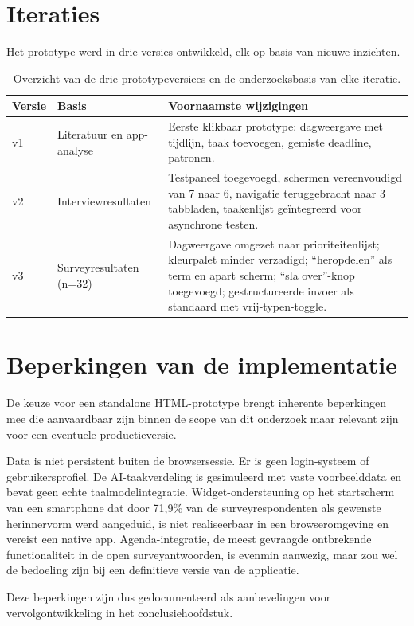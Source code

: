 \section{Iteraties}

Het prototype werd in drie versies ontwikkeld, elk op basis van nieuwe inzichten.

\begin{table}[h]
\centering
\begin{tabular}{p{1.2cm}p{3.5cm}p{7cm}}
\hline
\textbf{Versie} & \textbf{Basis} & \textbf{Voornaamste wijzigingen} \\
\hline
v1 & Literatuur en app-analyse &
Eerste klikbaar prototype: dagweergave met tijdlijn, taak toevoegen,
gemiste deadline, patronen. \\
v2 & Interviewresultaten &
Testpaneel toegevoegd, schermen vereenvoudigd van 7 naar 6, navigatie
teruggebracht naar 3 tabbladen, taakenlijst geïntegreerd voor
asynchrone testen. \\
v3 & Surveyresultaten (n=32) &
Dagweergave omgezet naar prioriteitenlijst; kleurpalet minder verzadigd;
``heropdelen'' als term en apart scherm; ``sla over''-knop toegevoegd;
gestructureerde invoer als standaard met vrij-typen-toggle. \\
\hline
\end{tabular}
\caption[Iteraties van het prototype]{Overzicht van de drie
prototypeversiees en de onderzoeksbasis van elke iteratie.}
\label{tab:iteraties}
\end{table}

\section{Beperkingen van de implementatie}

De keuze voor een standalone HTML-prototype brengt inherente beperkingen mee
die aanvaardbaar zijn binnen de scope van dit onderzoek maar relevant zijn voor
een eventuele productieversie.

Data is niet persistent buiten de browsersessie. Er is geen login-systeem of
gebruikersprofiel. De AI-taakverdeling is gesimuleerd met vaste voorbeelddata
en bevat geen echte taalmodelintegratie. Widget-ondersteuning op het startscherm
van een smartphone dat door 71,9\% van de surveyrespondenten als gewenste
herinnervorm werd aangeduid, is niet realiseerbaar in een browseromgeving en vereist
een native app. Agenda-integratie, de meest gevraagde ontbrekende functionaliteit
in de open surveyantwoorden, is evenmin aanwezig, maar zou wel de bedoeling zijn bij een definitieve versie van de applicatie.

Deze beperkingen zijn dus gedocumenteerd als aanbevelingen voor vervolgontwikkeling
in het conclusiehoofdstuk.